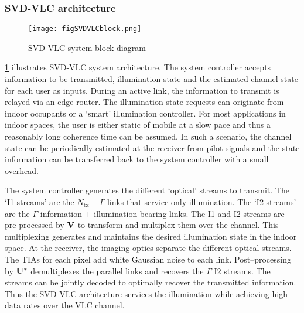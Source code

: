 \subsubsection{SVD-VLC architecture}
\label{subsubsec:svdvlcSystemArchitecture}

\begin{figure}[!t]
	\centering
		\texttt{[image: figSVDVLCblock.png]}
	\caption{SVD-VLC system block diagram}
	\label{fig:SVDVLCblock}
\end{figure}

\figurename{ \ref{fig:SVDVLCblock}} illustrates SVD-VLC system architecture. The system controller accepts information to be transmitted, illumination state and the estimated channel state for each user as inputs. During an active link, the information to transmit is relayed via an edge router. The illumination state requests can originate from indoor occupants or a `smart' illumination controller. For most applications in indoor spaces, the user is either static of mobile at a slow pace and thus a reasonably long coherence time can be assumed. In such a scenario, the channel state can be periodically estimated at the receiver from pilot signals and the state information can be transferred back to the system controller with a small overhead.

The system controller generates the different `optical' streams to transmit. The `I1-streams' are the $N_{\text{tx}}-\Gamma$ links that service only illumination. The `I2-streams' are the $\Gamma$ information $+$ illumination bearing links. The I1 and I2 streams are pre-processed by ${\bf{V}}$ to transform and multiplex them over the channel. This multiplexing generates and maintains the desired illumination state in the indoor space. At the receiver, the imaging optics separate the different optical streams. The TIAs for each pixel add white Gaussian noise to each link. Post--processing by ${\bf{U^{*}}}$ demultiplexes the parallel links and recovers the $\Gamma$ I2 streams. The streams can be jointly decoded to optimally recover the transmitted information. Thus the SVD-VLC architecture services the illumination while achieving high data rates over the VLC channel. 

%


